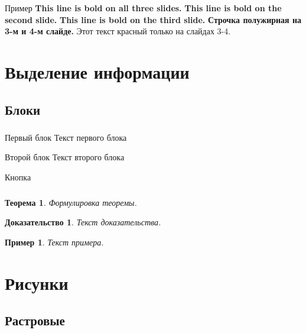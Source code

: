 \documentclass[russian]{beamer}
\newtheorem{rtheorem}{Теорема}
\newtheorem{rproof}{Доказательство}
\newtheorem{rexample}{Пример}
\begin{document}
\begin{frame}{Пример} \label{lab}
	\textbf{This line is bold on all three slides.}
	\textbf<2>{This line is bold on the second slide.}
	\textbf<3>{This line is bold on the third slide.}
	\textbf<3-4>{Строчка полужирная на 3-м и 4-м слайде.}
	 Этот текст красный только на слайдах 3-4.
\end{frame}

\section{Выделение информации}

\subsection{Блоки}

\begin{frame}
	\frametitle{\insertsection}
	\framesubtitle{\insertsubsection}
	\begin{block}{Первый блок}
		Текст первого блока
	\end{block}
	\begin{block}{Второй блок}
		Текст второго блока
	\end{block}
	\begin{block}{Кнопка}
		\hyperlink{lab}{}
	\end{block}
\end{frame}

\begin{frame}
	\frametitle{\insertsection}
	\framesubtitle{\insertsubsection}
	\begin{rtheorem}
		Формулировка теоремы.
	\end{rtheorem}
	\begin{rproof}
		Текст доказательства.
	\end{rproof}
	\begin{rexample}
		Текст примера.
	\end{rexample}
\end{frame}

\section{Рисунки}

\subsection{Растровые}
\end{document}
